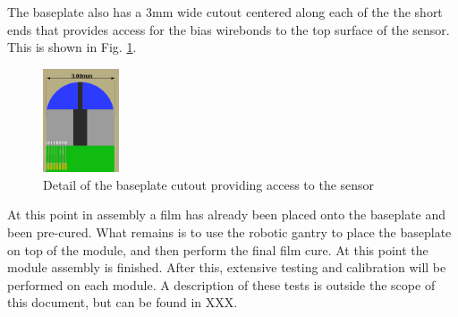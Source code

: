 \documentclass[10pt]{datasheet}
\begin{document}
The baseplate also has a 3mm wide cutout centered along each of the the short ends that provides access for the bias wirebonds to the top surface of the sensor. This is shown in Fig. \ref{fig:baseplate-detail}.

\begin{figure}[h]
	\centering
	\includegraphics[width=0.2\textwidth]{figures/baseplate-detail.png}
	\caption{Detail of the baseplate cutout providing access to the sensor}
	\label{fig:baseplate-detail}	
\end{figure}

At this point in assembly a film has already been placed onto the baseplate and been pre-cured. What remains is to use the robotic gantry to place the baseplate on top of the module, and then perform the final film cure. At this point the module assembly is finished. After this, extensive testing and calibration will be performed on each module. A description of these tests is outside the scope of this document, but can be found in XXX.
\end{document}
